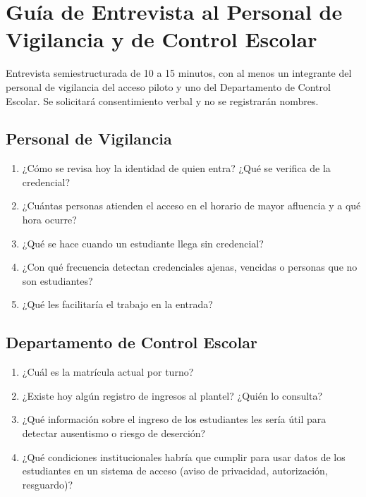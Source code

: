 \section{Guía de Entrevista al Personal de Vigilancia y de Control Escolar}
Entrevista semiestructurada de 10 a 15 minutos, con al menos un integrante del
personal de vigilancia del acceso piloto y uno del Departamento de Control
Escolar. Se solicitará consentimiento verbal y no se registrarán nombres.

\subsection{Personal de Vigilancia}
\begin{enumerate}
	\item ¿Cómo se revisa hoy la identidad de quien entra? ¿Qué se verifica de
	      la credencial?
	\item ¿Cuántas personas atienden el acceso en el horario de mayor afluencia y
	      a qué hora ocurre?
	\item ¿Qué se hace cuando un estudiante llega sin credencial?
	\item ¿Con qué frecuencia detectan credenciales ajenas, vencidas o personas
	      que no son estudiantes?
	\item ¿Qué les facilitaría el trabajo en la entrada?
\end{enumerate}

\subsection{Departamento de Control Escolar}
\begin{enumerate}
	\item ¿Cuál es la matrícula actual por turno?
	\item ¿Existe hoy algún registro de ingresos al plantel? ¿Quién lo consulta?
	\item ¿Qué información sobre el ingreso de los estudiantes les sería útil
	      para detectar ausentismo o riesgo de deserción?
	\item ¿Qué condiciones institucionales habría que cumplir para usar datos de
	      los estudiantes en un sistema de acceso (aviso de privacidad, autorización,
	      resguardo)?
\end{enumerate}

